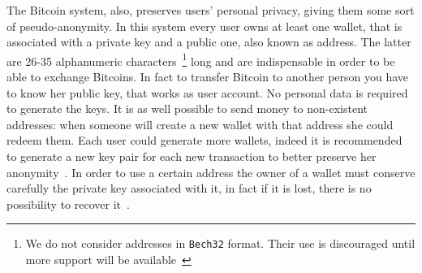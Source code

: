 The Bitcoin system, also, preserves users' personal privacy, giving them some
sort of pseudo-anonymity. In this system every user owns at least one wallet,
that is associated with a private key and a public one, also known as address.
The latter are 26-35 alphanumeric
characters~\cite{bib:bitcoinwiki:address}\footnote{We do not consider addresses
in \texttt{Bech32} format. Their use is
discouraged until more support will be available~\cite{bib:bitcoinwiki:bech32}}
long and are indispensable in order to be able to exchange Bitcoins.
In fact to transfer Bitcoin to another person you have to know her
public key, that works as user account. No personal data is required to generate
the keys. It is as well possible to send money to non-existent addresses: when
someone will create a new wallet with that address she could redeem
them. Each user could generate more wallets, indeed it is recommended
to generate a new key pair for each new transaction to better preserve
her anonymity~\cite{bib:satoshi}.
In order to use a certain address the owner of
a wallet must conserve carefully the private key associated with it, in fact
if it is lost, there is no possibility to recover it~\cite{bib:respCrypto}.


